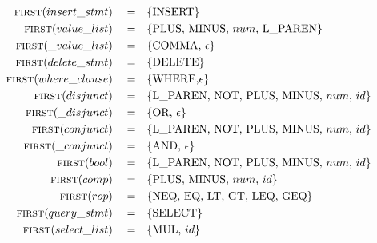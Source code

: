 \documentclass{article}
\begin{document}
\begin{align*}
\textsc{first}(insert\_stmt) \quad =& \quad\{\text{INSERT}\} \\
\textsc{first}(value\_list) \quad =& \quad\{\text{PLUS, MINUS, } num \text{, L\_PAREN}\} \\
\textsc{first}(\_value\_list) \quad =& \quad\{\text{COMMA, }\epsilon\} \\
\textsc{first}(delete\_stmt) \quad =& \quad\{\text{DELETE}\} \\
\textsc{first}(where\_clause) \quad =& \quad\{\text{WHERE,} \epsilon\} \\
\textsc{first}(disjunct) \quad =& \quad\{\text{L\_PAREN, NOT, PLUS, MINUS, }num\text{, }id\} \\
\textsc{first}(\_disjunct) \quad =& \quad\{\text{OR, }\epsilon\} \\
\textsc{first}(conjunct) \quad =& \quad\{\text{L\_PAREN, NOT, PLUS, MINUS, }num\text{, }id\} \\
\textsc{first}(\_conjunct) \quad =& \quad\{\text{AND, }\epsilon\} \\
\textsc{first}(bool) \quad =& \quad\{\text{L\_PAREN, NOT, PLUS, MINUS, }num\text{, }id\} \\
\textsc{first}(comp) \quad =& \quad\{\text{PLUS, MINUS, }num\text{, }id\} \\
\textsc{first}(rop) \quad =& \quad\{\text{NEQ, EQ, LT, GT, LEQ, GEQ}\} \\
\textsc{first}(query\_stmt) \quad =& \quad\{\text{SELECT}\} \\
\textsc{first}(select\_list) \quad =& \quad\{\text{MUL, }id\} \\
\end{align*}
\end{document}
